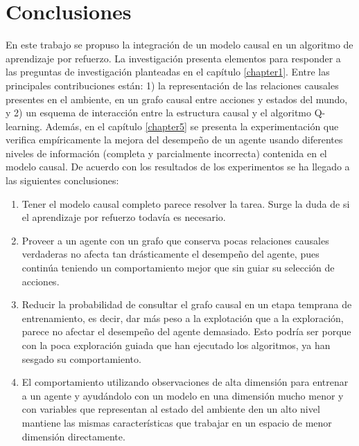 \chapter{Conclusiones}\label{chapter6}

\graphicspath{{Chapter5/Figs/}}

En este trabajo se propuso la integración de un modelo causal en un
algoritmo de aprendizaje por refuerzo.
La investigación presenta
elementos para responder a las preguntas de investigación planteadas en el capítulo \ref{chapter1}. Entre las principales contribuciones están: 1) la representación de las relaciones causales presentes en el ambiente, en un grafo causal entre acciones y estados del mundo, y 2) un esquema de interacción entre la estructura causal y el algoritmo Q-learning. 
Además, en el capítulo \ref{chapter5} se presenta la experimentación que verifica empíricamente
    la mejora del desempeño de un agente usando diferentes niveles de información (completa y parcialmente incorrecta) contenida en el modelo causal. De acuerdo con los resultados de los experimentos 
    se ha llegado a las siguientes conclusiones:
    
\begin{enumerate}
    \item Tener el modelo causal completo parece resolver la tarea. Surge la 
    duda de si el aprendizaje por refuerzo todavía es necesario.
    \item Proveer a un agente con un grafo que conserva pocas relaciones
    causales verdaderas no afecta tan drásticamente el desempeño del agente, pues 
    continúa teniendo un comportamiento mejor que sin guiar su selección de acciones.
    \item Reducir la probabilidad de consultar el grafo causal en un etapa 
    temprana de entrenamiento, es decir, dar más peso a la explotación que a la exploración, parece no afectar el desempeño del agente demasiado. Esto podría
    ser porque con la poca exploración guiada que han ejecutado los algoritmos,
    ya han sesgado su comportamiento.
    
    \item El comportamiento utilizando observaciones de alta dimensión para entrenar a un agente y ayudándolo con un modelo en una dimensión mucho menor y con variables que representan al estado del ambiente den un alto nivel mantiene las mismas características que trabajar en un espacio de menor dimensión directamente.
\end{enumerate}

